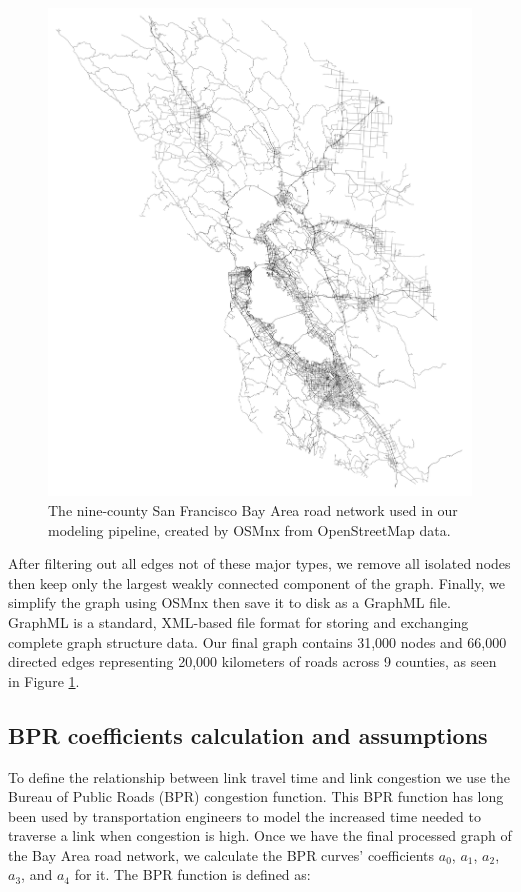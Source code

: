 \begin{figure}[htbp]
    \center
    \includegraphics[width=\textwidth]
    {graphics/bay_area_network.png}
    \caption{The nine-county San Francisco Bay Area road network used in our modeling pipeline, created by OSMnx from OpenStreetMap data.}
    \label{fig:bay_area_road_network}
\end{figure}

After filtering out all edges not of these major types, we remove all isolated nodes then keep only the largest weakly connected component of the graph. Finally, we simplify the graph using OSMnx then save it to disk as a GraphML file. GraphML is a standard, XML-based file format for storing and exchanging complete graph structure data. Our final graph contains 31,000 nodes and 66,000 directed edges representing 20,000 kilometers of roads across 9 counties, as seen in Figure \ref{fig:bay_area_road_network}.

\subsection{BPR coefficients calculation and assumptions}
To define the relationship between link travel time and link congestion we use the Bureau of Public Roads (BPR) congestion function. This BPR function has long been used by transportation engineers to model the increased time needed to traverse a link when congestion is high. Once we have the final processed graph of the Bay Area road network, we calculate the BPR  curves' coefficients $a_0$, $a_1$, $a_2$, $a_3$, and $a_4$ for it. The BPR function is defined as:

